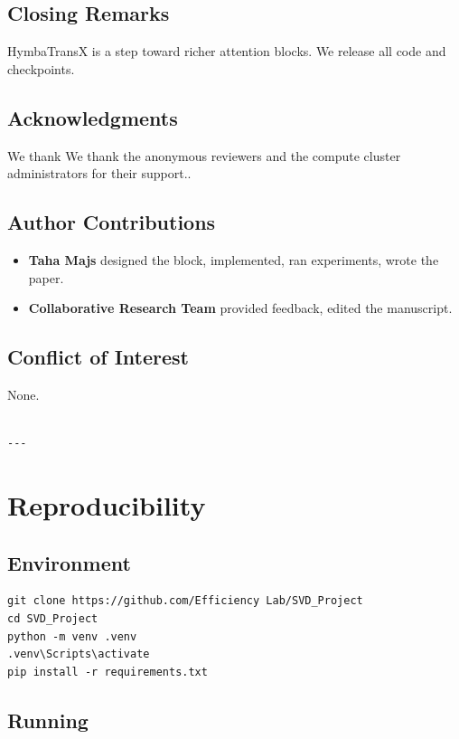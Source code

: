 \subsection{Closing Remarks}

HymbaTransX is a step toward richer attention blocks. We release all code 
and checkpoints.

\subsection{Acknowledgments}

We thank We thank the anonymous reviewers and the compute cluster administrators for their support..

\subsection{Author Contributions}

\begin{itemize}
\item \textbf{Taha Majs} designed the block, implemented, ran experiments, wrote
  the paper.
\item \textbf{Collaborative Research Team} provided feedback, edited the manuscript.

\end{itemize}
\subsection{Conflict of Interest}

None.
\begin{lstlisting}

---
\end{lstlisting}

\section{Reproducibility}

\subsection{Environment}

\begin{lstlisting}
git clone https://github.com/Efficiency Lab/SVD_Project
cd SVD_Project
python -m venv .venv
.venv\Scripts\activate
pip install -r requirements.txt
\end{lstlisting}

\subsection{Running}

